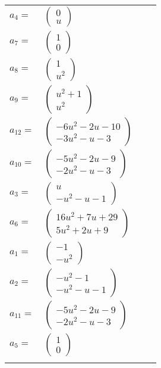 \documentclass[1p]{elsarticle_modified}
\theoremstyle{definition}
\begin{document}
\begin{tabular}{m{7pt} m{180pt} m{7pt} m{180pt} }
\flushright $a_{4}=$&$\begin{pmatrix}0\\u\end{pmatrix}$ \\
\flushright $a_{7}=$&$\begin{pmatrix}1\\0\end{pmatrix}$ \\
\flushright $a_{8}=$&$\begin{pmatrix}1\\u^2\end{pmatrix}$ \\
\flushright $a_{9}=$&$\begin{pmatrix}u^2+1\\u^2\end{pmatrix}$ \\
\flushright $a_{12}=$&$\begin{pmatrix}-6 u^2-2 u-10\\-3 u^2- u-3\end{pmatrix}$ \\
\flushright $a_{10}=$&$\begin{pmatrix}-5 u^2-2 u-9\\-2 u^2- u-3\end{pmatrix}$ \\
\flushright $a_{3}=$&$\begin{pmatrix}u\\- u^2- u-1\end{pmatrix}$ \\
\flushright $a_{6}=$&$\begin{pmatrix}16 u^2+7 u+29\\5 u^2+2 u+9\end{pmatrix}$ \\
\flushright $a_{1}=$&$\begin{pmatrix}-1\\- u^2\end{pmatrix}$ \\
\flushright $a_{2}=$&$\begin{pmatrix}- u^2-1\\- u^2- u-1\end{pmatrix}$ \\
\flushright $a_{11}=$&$\begin{pmatrix}-5 u^2-2 u-9\\-2 u^2- u-3\end{pmatrix}$ \\
\flushright $a_{5}=$&$\begin{pmatrix}1\\0\end{pmatrix}$\\&\end{tabular}
\end{document}
